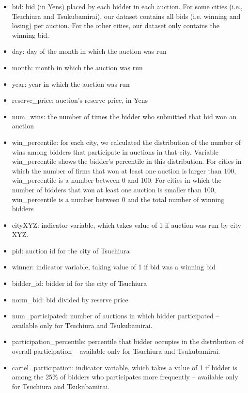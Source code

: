 \documentclass[12pt,  letterpaper]{article}
\newcommand{\1}{\mathbf{1}}
\begin{document}
\begin{onehalfspacing}
\begin{itemize}
\item \textsf{bid}: bid (in Yens) placed by each bidder in each auction. For some cities (i.e., Tsuchiura and Tsukubamirai), our dataset contains all bids (i.e. winning and losing) per auction. For the other cities, our dataset only contains the winning bid.  
\item \textsf{day}: day of the month in which the auction was run
\item \textsf{month}: month in which the auction was run
\item \textsf{year}: year in which the auction was run
\item \textsf{reserve\_price}: auction's reserve price, in Yens
\item \textsf{num\_wins}: the number of times the bidder who submitted that bid won an auction
\item \textsf{win\_percentile}: for each city, we calculated the distribution of the number of wins among bidders that participate in auctions in that city. Variable \textsf{win\_percentile} shows the bidder's percentile in this distribution. For cities in which the number of firms that won at least one auction is larger than 100, \textsf{win\_percentile} is a number between 0 and 100. For cities in which the number of bidders that won at least one auction is smaller than 100, \textsf{win\_percentile} is a number between 0 and the total number of winning bidders
\item \textsf{cityXYZ}: indicator variable, which takes value of 1 if auction was run by city XYZ.
\item \textsf{pid}: auction id for the city of Tsuchiura
\item \textsf{winner}: indicator variable, taking value of 1 if bid was a winning bid
\item \textsf{bidder\_id}: bidder id for the city of Tsuchiura
\item \textsf{norm\_bid}: bid divided by reserve price
\item \textsf{num\_participated}: number of auctions in which bidder participated -- available only for Tsuchiura and Tsukubamirai.
\item \textsf{participation\_percentile}: percentile that bidder occupies in the distribution of overall participation -- available only for Tsuchiura and Tsukubamirai.     
\item \textsf{cartel\_participation}: indicator variable, which takes a value of 1 if bidder is among the 25\% of bidders who participates more frequently -- available only for Tsuchiura and Tsukubamirai.
\end{itemize}
\end{onehalfspacing}
\end{document}
